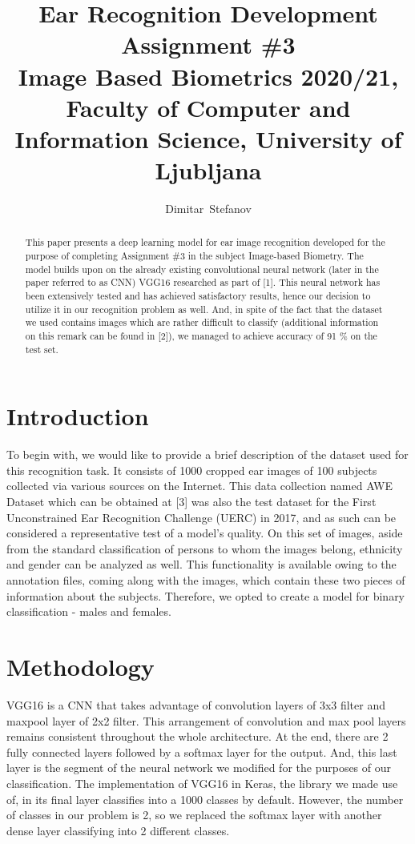 \documentclass[9pt]{IEEEtran}
\title{\vspace{0ex} %
Ear Recognition Development
\\ \large{Assignment \#3}\\ \normalsize{Image Based Biometrics 2020/21, Faculty of Computer and Information Science, University of Ljubljana}}
\author{ %
Dimitar~Stefanov
\vspace{-4.0ex}
}
\begin{document}
\maketitle

\begin{abstract}
This paper presents a deep learning model for ear image recognition developed for the purpose of completing Assignment \#3 in the subject Image-based Biometry. The model builds upon on the already existing convolutional neural network (later in the paper referred to as CNN) VGG16 researched as part of [1]. This neural network has been extensively tested and has achieved satisfactory results, hence our decision to utilize it in our recognition problem as well. 
And, in spite of the fact that the dataset we used contains images which are rather difficult to classify (additional information on this remark can be found in [2]), we managed to achieve accuracy of 91 \% on the test set.
\end{abstract}

\section{Introduction}
To begin with, we would like to provide a brief description of the dataset used for this recognition task. It consists of 1000 cropped ear images of 100 subjects collected via various sources on the Internet. This data collection named AWE Dataset which can be obtained at [3] was also the test dataset for the First Unconstrained Ear Recognition Challenge (UERC) in 2017, and as such can be considered a representative test of a model's quality. On this set of images, aside from the standard classification of persons to whom the images belong, ethnicity and gender can be analyzed as well. This functionality is available owing to the annotation files, coming along with the images, which contain these two pieces of information about the subjects. Therefore, we opted to create a model for binary classification - males and females.

\section{Methodology}
VGG16 is a CNN that takes advantage of convolution layers of 3x3 filter and maxpool layer of 2x2 filter. This arrangement of convolution and max pool layers remains consistent throughout the whole architecture. At the end, there are 2 fully connected layers followed by a softmax layer for the output. And, this last layer is the segment of the neural network we modified for the purposes of our classification. The implementation of VGG16 in Keras, the library we made use of, in its final layer classifies into a 1000 classes by default. However, the number of classes in our problem is 2, so we replaced the softmax layer with another dense layer classifying into 2 different classes.
\end{document}
